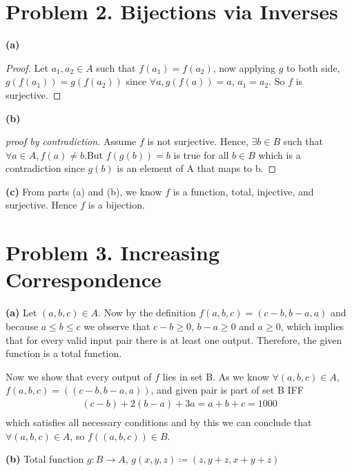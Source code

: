 \documentclass{article}
\begin{document}
\section*{Problem 2. Bijections via Inverses}

\textbf{(a)}
\begin{proof}[Proof]
Let $a_1,a_2 \in A$ such that $f(a_1) = f(a_2)$, now applying $g$ to both side, $g(f(a_1)) = g(f(a_2))$ since $\forall a, g(f(a)) = a$,
$a_1 = a_2$. So $f$ is surjective. 
\end{proof}

\vspace{\baselineskip}
\noindent\textbf{(b)}
\begin{proof}[proof by contradiction]
Assume $f$ is not surjective. Hence, $\exists b \in B$ such that $\forall a \in A, f(a) \neq b$.But $f(g(b)) = b$ is true for all $b\in B$
which is a contradiction since $g(b)$ is an element of A that maps to b.
\end{proof}

\noindent\textbf{(c)} From parts (a) and (b), we know $f$ is a function, total, injective, and surjective. Hence $f$ is a bijection.


\section*{Problem 3. Increasing Correspondence}

\textbf{(a)}
Let $(a,b,c) \in A$. Now by the definition $f(a,b,c) = (c-b,b-a,a)$ and because $a \leq b \leq c$ we observe that $c-b \geq 0$,
$b-a \geq 0$ and $a \geq 0$, which implies that for every valid input pair there is at least one output.
Therefore, the given function is a total function.

Now we show that every output of $f$ lies in set B. As we know $\forall(a,b,c) \in A$, $f(a,b,c) = ((c-b,b-a,a))$, and given pair is
part of set B IFF
\[
\begin{aligned}
(c-b) + 2(b-a) + 3a = a + b + c = 1000\\
\end{aligned}
\]
which satisfies all necessary conditions and by this we can conclude that $\forall (a, b, c) \in A$,
so $f((a, b, c)) \in B$.

\pagebreak

\vspace{\baselineskip}
\noindent\textbf{(b)}
Total function $g:B \rightarrow A$, $g(x,y,z) \coloneq (z, y+z, x+y+z)$
\end{document}
